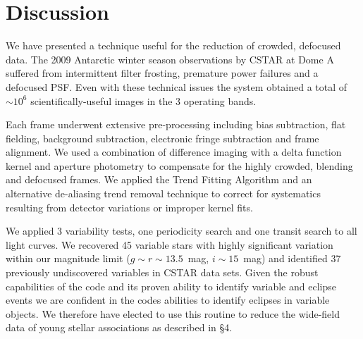 \section{Discussion}
We have presented a technique useful for the reduction of crowded, defocused data. The 2009 Antarctic winter season observations by CSTAR at Dome A suffered from intermittent filter frosting, premature power failures and a defocused PSF. Even with these technical issues the system obtained a total of $\sim 10^6$ scientifically-useful images in the 3 operating bands.

Each frame underwent extensive pre-processing including bias subtraction, flat fielding, background subtraction, electronic fringe subtraction and frame alignment. We used a combination of difference imaging with a delta function kernel and aperture photometry to compensate for the highly crowded, blending and defocused frames. We applied the Trend Fitting Algorithm and an alternative de-aliasing trend removal technique to correct for systematics resulting from detector variations or improper kernel fits. 

We applied 3 variability tests, one periodicity search and one transit search to all light curves. We recovered 45 variable stars with highly significant variation within our magnitude limit ($g\sim r \sim 13.5$~mag, $i\sim15$~mag) and identified 37 previously undiscovered variables in CSTAR data sets. Given the robust capabilities of the code and its proven ability to identify variable and eclipse events we are confident in the codes abilities to identify eclipses in variable objects. We therefore have elected to use this routine to reduce the wide-field data of young stellar associations as described in \S4.